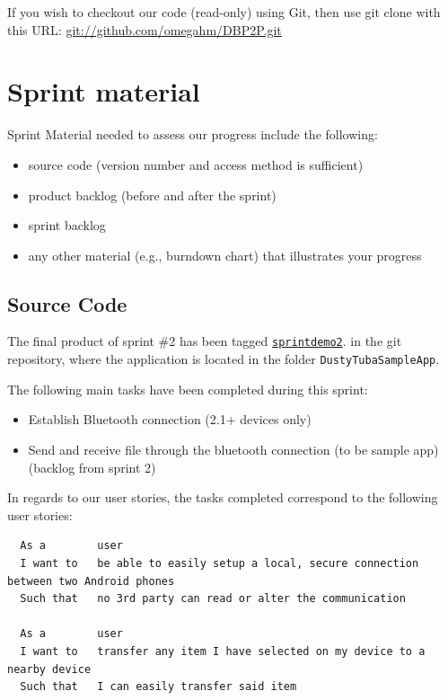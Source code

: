 \documentclass[a4paper,11pt]{article}
\begin{document}
If you wish to checkout our code (read-only) using Git, then use git clone with this URL:
\url{git://github.com/omegahm/DBP2P.git}


\section{Sprint material}
Sprint Material needed to assess our progress include the following:
\begin{itemize}
\item source code (version number and access method is sufficient)
\item product backlog (before and after the sprint)
\item sprint backlog
\item any other material (e.g., burndown chart) that illustrates your progress
\end{itemize}


\subsection{Source Code}

The final product of sprint \#2 has been tagged \href{https://github.com/omegahm/DBP2P/tree/sprintdemo2}{\tt sprintdemo2}. in the git repository, where the application is located in the folder {\tt DustyTubaSampleApp}.

The following main tasks have been completed during this sprint:
\begin{itemize}
	\item Establish Bluetooth connection (2.1+ devices only)
	\item Send and receive file through the bluetooth connection (to be sample app) (backlog from sprint 2)
\end{itemize}

In regards to our user stories, the tasks completed correspond to the following user stories:
\begin{verbatim}
  As a        user
  I want to   be able to easily setup a local, secure connection between two Android phones
  Such that   no 3rd party can read or alter the communication

  As a        user
  I want to   transfer any item I have selected on my device to a nearby device
  Such that   I can easily transfer said item
\end{verbatim}
\end{document}
